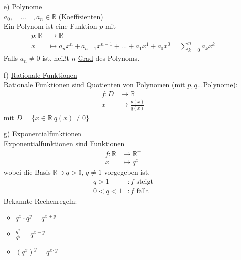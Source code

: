 \documentclass[12pt, titlepage]{article}
\newcommand{\R}{\mathds{R}}
\renewcommand{\>}{\rightarrow}
\renewcommand{\*}{\cdot}
\begin{document}
\begin{itemize}
\begin{itemize}
\begin{itemize}
\begin{minipage}[c]{0.5\textwidth}
				\end{minipage}
			\end{itemize}
		\end{itemize}
		\item[e)] \underline{Polynome}\\
		$a_0,\quad...\quad,a_n\in\R$ (Koeffizienten)\\
		Ein Polynom ist eine Funktion $p$ mit 
		\begin{align*}
			p\colon \R&\>\R\\
			x&\mapsto a_nx^n+a_{n-1}x^{n-1}+...+a_1x^1+a_0x^0=\sum_{k=0}^{n}{a_kx^k}
		\end{align*}
		Falls $a_n\neq 0$ ist, heißt $n$ \underline{Grad} des Polynoms.
		\item[f)] \underline{Rationale Funktionen}\\
		Rationale Funktionen sind Quotienten von Polynomen (mit $p,q$...Polynome):
		\begin{align*}
			f\colon D&\>\R\\
			x&\mapsto\frac{p(x)}{q(x)}
		\end{align*}
		mit $D=\{x\in\R|q(x)\neq 0\}$
		\item[g)] \underline{Exponentialfunktionen}\\
		Exponentialfunktionen sind Funktionen
		\begin{align*}
			f\colon\R&\>\R^+\\
			x&\mapsto q^x
		\end{align*} wobei die Basis $\R\ni q>0$, $q\neq 1$ vorgegeben ist.
		\begin{align*}
			q>1&\colon\textrm{$f$ steigt}\\
			0<q<1&\colon\textrm{$f$ fällt}
		\end{align*}
		Bekannte Rechenregeln:
		\begin{itemize}
			\item $q^x\* q^y=q^{x+y}$
			\item $\frac{q^x}{q^y}=q^{x-y}$
			\item $(q^x)^y=q^{x\* y}$

\end{itemize}
\end{itemize}
\end{document}
